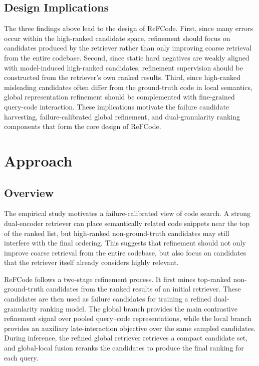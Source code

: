 \documentclass[10pt,conference]{IEEEtran}
\newcommand{\method}{ReFCode}
\begin{document}
\subsection{Design Implications}

The three findings above lead to the design of \method{}. First, since many errors occur within the high-ranked candidate space, refinement should focus on candidates produced by the retriever rather than only improving coarse retrieval from the entire codebase. Second, since static hard negatives are weakly aligned with model-induced high-ranked candidates, refinement supervision should be constructed from the retriever's own ranked results. Third, since high-ranked misleading candidates often differ from the ground-truth code in local semantics, global representation refinement should be complemented with fine-grained query-code interaction. These implications motivate the failure candidate harvesting, failure-calibrated global refinement, and dual-granularity ranking components that form the core design of \method{}.



\section{Approach}
\label{sec:approach}

\subsection{Overview}
\label{sec:approach_overview}

The empirical study motivates a failure-calibrated view of code search. A strong dual-encoder retriever can place semantically related code snippets near the top of the ranked list, but high-ranked non-ground-truth candidates may still interfere with the final ordering. This suggests that refinement should not only improve coarse retrieval from the entire codebase, but also focus on candidates that the retriever itself already considers highly relevant.

\method{} follows a two-stage refinement process. It first mines top-ranked non-ground-truth candidates from the ranked results of an initial retriever. These candidates are then used as failure candidates for training a refined dual-granularity ranking model. The global branch provides the main contrastive refinement signal over pooled query--code representations, while the local branch provides an auxiliary late-interaction objective over the same sampled candidates. During inference, the refined global retriever retrieves a compact candidate set, and global-local fusion reranks the candidates to produce the final ranking for each query.
\end{document}
